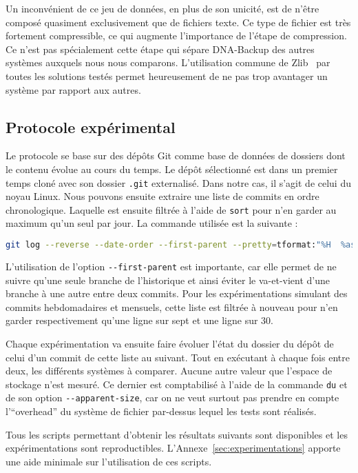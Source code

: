 \documentclass[a4paper]{report}
\begin{document}
Un inconvénient de ce jeu de données, en plus de son unicité,
est de n'être composé quasiment exclusivement que de fichiers texte.
Ce type de fichier est très fortement compressible,
ce qui augmente l'importance de l'étape de compression.
Ce n'est pas spécialement cette étape qui sépare DNA-Backup
des autres systèmes auxquels nous nous comparons.
L'utilisation commune de Zlib~\cite{rfc1950} par toutes les solutions testés
permet heureusement de ne pas trop avantager un système par rapport aux autres.

\subsection{Protocole expérimental}
\label{sec:protocole-experimental}

Le protocole se base sur des dépôts Git comme base de données
de dossiers dont le contenu évolue au cours du temps.
Le dépôt sélectionné est dans un premier temps cloné avec son dossier \verb|.git| externalisé.
Dans notre cas, il s'agit de celui du noyau Linux.
Nous pouvons ensuite extraire une liste de commits en ordre chronologique.
Laquelle est ensuite filtrée à l'aide de \verb|sort|
pour n'en garder au maximum qu'un seul par jour.
La commande utilisée est la suivante :

\begin{lstlisting}[language=sh]
git log --reverse --date-order --first-parent --pretty=tformat:"%H	%as" | sort --unique --key=2
\end{lstlisting}

L'utilisation de l'option \verb|--first-parent| est importante,
car elle permet de ne suivre qu'une seule branche de l'historique
et ainsi éviter le va-et-vient d'une branche à une autre entre deux commits.
Pour les expérimentations simulant des commits hebdomadaires et mensuels,
cette liste est filtrée à nouveau pour n'en garder respectivement
qu'une ligne sur sept et une ligne sur 30.

Chaque expérimentation va ensuite faire évoluer l'état du dossier du dépôt
de celui d'un commit de cette liste au suivant.
Tout en exécutant à chaque fois entre deux, les différents systèmes à comparer.
Aucune autre valeur que l'espace de stockage n'est mesuré.
Ce dernier est comptabilisé à l'aide de la commande \verb|du|
et de son option \verb|--apparent-size|, car on ne veut surtout pas prendre en compte l'``overhead''
du système de fichier par-dessus lequel les tests sont réalisés.

Tous les scripts permettant d'obtenir les résultats suivants sont disponibles
et les expérimentations sont reproductibles.
L'Annexe~\ref{sec:experimentations} apporte une aide minimale sur l'utilisation de ces scripts.
\end{document}
